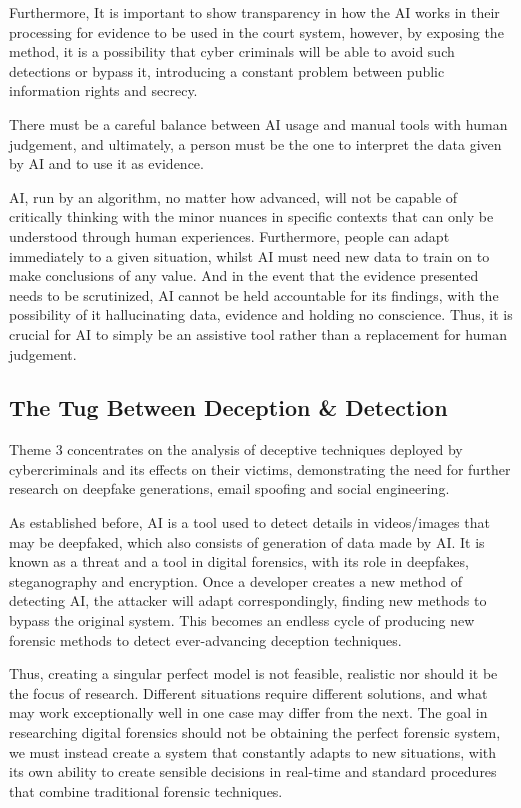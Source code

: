 \documentclass[12pt,a4paper]{article}
\begin{document}
Furthermore, It is important to show transparency in how the AI works in their processing for evidence to be used in the court system, however, by exposing the method, it is a possibility that cyber criminals will be able to avoid such detections or bypass it, introducing a constant problem between public information rights and secrecy.

There must be a careful balance between AI usage and manual tools with human judgement, and ultimately, a person must be the one to interpret the data given by AI and to use it as evidence. 

AI, run by an algorithm, no matter how advanced, will not be capable of critically thinking with the minor nuances in specific contexts that can only be understood through human experiences. Furthermore, people can adapt immediately to a given situation, whilst AI must need new data to train on to make conclusions of any value. And in the event that the evidence presented needs to be scrutinized, AI cannot be held accountable for its findings, with the possibility of it hallucinating data, evidence and holding no conscience. Thus, it is crucial for AI to simply be an assistive tool rather than a replacement for human judgement.

\subsection{The Tug Between Deception \&  Detection}

Theme 3 concentrates on the analysis of deceptive techniques deployed by cybercriminals and its effects on their victims, demonstrating the need for further research on deepfake generations, email spoofing and social engineering. 

As established before, AI is a tool used to detect details in videos/images that may be deepfaked, which also consists of generation of data made by AI. It is known as a threat and a tool in digital forensics, with its role in deepfakes, steganography and encryption. Once a developer creates a new method of detecting AI, the attacker will adapt correspondingly, finding new methods to bypass the original system. This becomes an endless cycle of producing new forensic methods to detect ever-advancing deception techniques. 

Thus, creating a singular perfect model is not feasible, realistic nor should it be the focus of research. Different situations require different solutions, and what may work exceptionally well in one case may differ from the next. The goal in researching digital forensics should not be obtaining the perfect forensic system, we must instead create a system that constantly adapts to new situations, with its own ability to create sensible decisions in real-time and standard procedures that combine traditional forensic techniques. 
\end{document}
